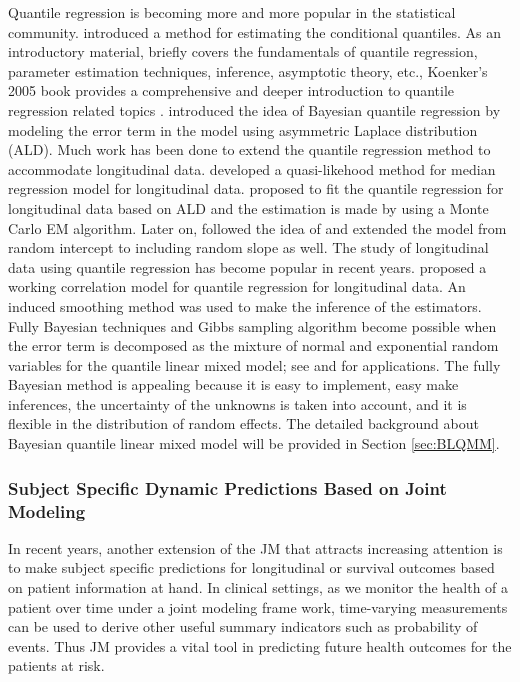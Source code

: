 Quantile regression is becoming more and more popular in the statistical community. \cite{koenker1978regression} introduced a method for estimating the conditional quantiles. As an introductory material, \cite{koenker2001quantile} briefly covers the fundamentals of quantile regression, parameter estimation techniques, inference, asymptotic theory, etc., Koenker's 2005 book provides a comprehensive and deeper introduction to quantile regression related topics \citep{koenker2005quantile}.  \cite{yu2001bayesian} introduced the idea of Bayesian quantile regression by modeling the error term in the model using asymmetric Laplace distribution (ALD). Much work has been done to extend the quantile regression method to accommodate longitudinal data. \cite{jung1996quasi} developed a quasi-likehood method for median regression model for longitudinal data. \cite{geraci2007quantile} proposed to fit the quantile regression for longitudinal data based on ALD and the estimation is made by using a Monte Carlo EM algorithm. Later on, \cite{liu2009mixed} followed the idea of \cite{geraci2007quantile} and extended the model from random intercept to including random slope as well. The study of longitudinal data using quantile regression has become popular in recent years. \cite{fu2012quantile} proposed  a working correlation model for quantile regression for longitudinal data. An induced smoothing method was used to make the inference of the estimators. Fully Bayesian techniques and  Gibbs sampling algorithm become possible when the error term is decomposed as the mixture of normal and exponential random variables for the quantile linear mixed model; see \cite{kozumi2011gibbs} and \cite{luo2012bayesian} for applications. The fully Bayesian method is appealing because it is easy to implement, easy make inferences, the uncertainty of the unknowns is taken into account, and it is flexible in the distribution of random effects. The detailed background about Bayesian quantile linear mixed model will be provided in Section \ref{sec:BLQMM}.\par


\subsubsection{Subject Specific Dynamic Predictions Based on Joint Modeling}\label{sec:bak_pred_jm}
In recent years, another extension of the JM that attracts increasing attention is to make subject specific predictions for longitudinal or survival outcomes based on patient information at hand. In clinical settings, as we monitor the health of a patient over time under a joint modeling frame work, time-varying measurements can be used to derive other useful summary indicators such as probability of events. Thus JM provides a vital tool in predicting future health outcomes for the patients at risk. \par

